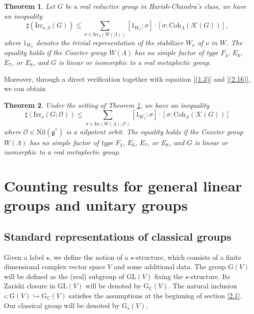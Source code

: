 \documentclass[12pt, a4paper]{amsart}
\numberwithin{equation}{section}
\newtheorem{thm}{Theorem}[section]
\newcommand{\BC}{{\mathbb {C}}}
\newcommand{\CK}{{\mathcal {K}}}
\newcommand{\CO}{{\mathcal {O}}}
\newcommand{\fg}{\mathfrak{g}}
\newcommand{\GL}{{\mathrm{GL}}}
\newcommand{\G}{{\mathrm{G}}}
\newcommand{\Irr}{{\mathrm{Irr}}}
\newcommand{\Nil}{{\mathrm{Nil}}}
\renewcommand{\bar}{\overline}
\begin{document}
\begin{thm}\label{counting}
    Let $G$ be a real reductive group in Harish-Chandra's class, we have an inequality
    \begin{equation}
        \sharp(\Irr_{\nu,S}(G)) \leq \sum_{\sigma \in \Irr_{S}(W(\Lambda))} [1_{W_\nu}:\sigma] \cdot [\sigma:\mathrm{Coh}_{\Lambda}(\CK(G))],
    \end{equation}
    where $1_{W_\nu}$ denotes the trivial representation of the stabilizer $W_\nu$ of $\nu$ in $W$. The equality holds if the Coxeter group $W(\Lambda)$ has no simple factor of type $F_4$, $E_6$, $E_7$, or $E_8$, and $G$ is linear or isomorphic to a real metaplectic group.
\end{thm}

Moreover, through a direct verification together with equation \ref{(1.3)} and \ref{(2.16)}, we can obtain

\begin{thm}
    Under the setting of Theorem \ref{counting}, we have an inequality
    \begin{equation}
        \sharp(\Irr_{\nu}(G;\CO)) \leq \sum_{\sigma \in \Irr(W(\Lambda);\CO)}[1_{W_\nu}:\sigma] \cdot [\sigma:\mathrm{Coh}_{\Lambda}(\CK(G))]
    \end{equation}
    where $\CO \in \bar{\Nil}(\fg^*)$ is a nilpotent orbit.  The equality holds if the Coxeter group $W(\Lambda)$ has no simple factor of type $F_4$, $E_6$, $E_7$, or $E_8$, and $G$ is linear or isomorphic to a real metaplectic group.
\end{thm}




\section{Counting results for general linear groups and unitary groups}

   \subsection{Standard representations of classical groups}\label{3.1}

   Given a label $\star$, we define the notion of a $\star$-structure, which consists of a finite dimensional complex vector space $V$ and some additional data. The group $\G(V)$ will be defined as the (real) subgroup of $\GL(V)$ fixing the $\star$-structure. Its Zariski closure in $\GL(V)$ will be denoted by $\G_{\BC}(V)$. The natural inclusion $\iota: \G(V) \hookrightarrow \G_{\BC}(V)$ satisfies the assumptions at the beginning of section \ref{2.1}. Our classical group will be denoted by $\G_{\star}(V)$.
\end{document}
